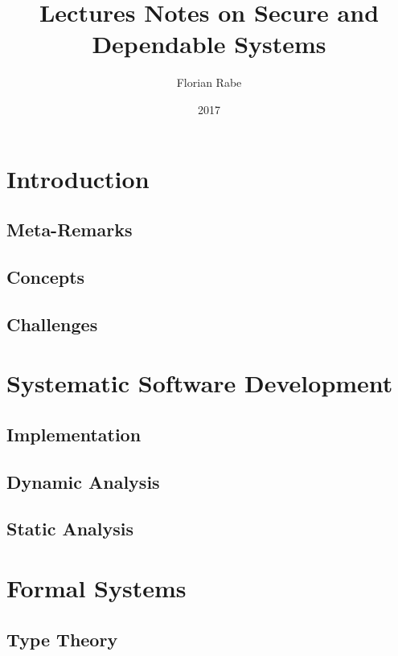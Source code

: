 \documentclass{book}
\title{Lectures Notes on Secure and Dependable Systems}
\author{Florian Rabe}
\date{2017}
\begin{document}
\maketitle

\tableofcontents
\newpage

\part{Introduction}

 \chapter{Meta-Remarks}
  

  \chapter{Concepts}
   

 \chapter{Challenges}
   

\part{Systematic Software Development}

  \chapter{Implementation}\label{sec:sd:systimpl}
    

  \chapter{Dynamic Analysis}\label{sec:sd:dynamic}
    

  \chapter{Static Analysis}\label{sec:sd:static}
    
    
\part{Formal Systems}\label{sec:sd:fs}
   
  \chapter{Type Theory}\label{sec:sd:typetheory}
  
\end{document}
